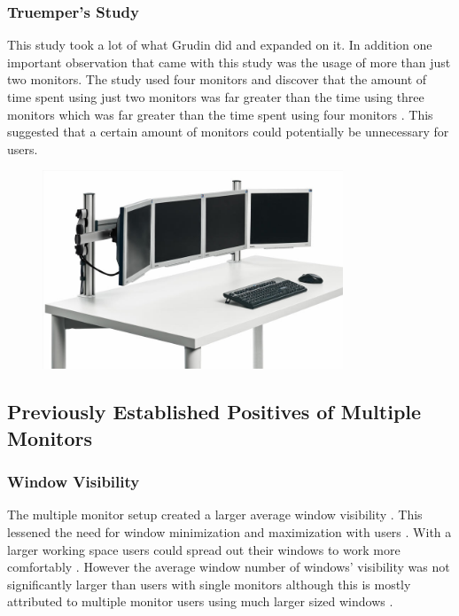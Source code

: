 \documentclass[a4paper]{article}
\begin{document}
\subsubsection{Truemper's Study}
This study took a lot of what Grudin did and expanded on it. In addition one important observation that came with this study was the usage of more than just two monitors. The study used four monitors and discover that the amount of time spent using just two monitors was far greater than the time using three monitors which was far greater than the time spent using four monitors \cite{Truemper}. This suggested that a certain amount of monitors could potentially be unnecessary for users.
\begin{figure}[H]
\centering
\includegraphics[width=0.8\textwidth]{4inRow.jpg}
\end{figure}

\subsection{Previously Established Positives of Multiple Monitors}

\subsubsection{Window Visibility}
The multiple monitor setup created a larger average window visibility \cite{Hutchings}. This lessened the need for window minimization and maximization with users \cite{Grudin}. With a larger working space users could spread out their windows to work more comfortably \cite{Truemper}. However the average window number of windows' visibility was not significantly larger than users with single monitors although this is mostly attributed to multiple monitor users using much larger sized windows \cite{Hutchings}.
\end{document}
